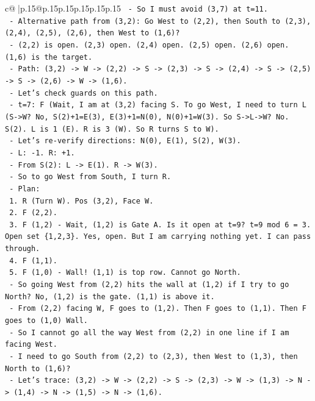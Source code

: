 \documentclass{article}
\begin{document}
{\begin{supertabular}{c@{$\;$}|p{.15\linewidth}@{}p{.15\linewidth}p{.15\linewidth}p{.15\linewidth}p{.15\linewidth}p{.15\linewidth}}
{{{\texttt{  {-} So I must avoid (3,7) at t=11.} \\
\texttt{  {-} Alternative path from (3,2): Go West to (2,2), then South to (2,3), (2,4), (2,5), (2,6), then West to (1,6)?} \\
\texttt{    {-} (2,2) is open. (2,3) open. (2,4) open. (2,5) open. (2,6) open. (1,6) is the target.} \\
\texttt{    {-} Path: (3,2) {-}> W {-}> (2,2) {-}> S {-}> (2,3) {-}> S {-}> (2,4) {-}> S {-}> (2,5) {-}> S {-}> (2,6) {-}> W {-}> (1,6).} \\
\texttt{    {-} Let's check guards on this path.} \\
\texttt{    {-} t=7: F (Wait, I am at (3,2) facing S. To go West, I need to turn L (S{-}>W? No, S(2)+1=E(3), E(3)+1=N(0), N(0)+1=W(3). So S{-}>L{-}>W? No. S(2). L is 1 (E). R is 3 (W). So R turns S to W).} \\
\texttt{    {-} Let's re{-}verify directions: N(0), E(1), S(2), W(3).} \\
\texttt{      {-} L: {-}1. R: +1.} \\
\texttt{      {-} From S(2): L {-}> E(1). R {-}> W(3).} \\
\texttt{      {-} So to go West from South, I turn R.} \\
\texttt{    {-} Plan:} \\
\texttt{      1. R (Turn W). Pos (3,2), Face W.} \\
\texttt{      2. F (2,2).} \\
\texttt{      3. F (1,2) {-} Wait, (1,2) is Gate A. Is it open at t=9? t=9 mod 6 = 3. Open set \{1,2,3\}. Yes, open. But I am carrying nothing yet. I can pass through.} \\
\texttt{      4. F (1,1).} \\
\texttt{      5. F (1,0) {-} Wall! (1,1) is top row. Cannot go North.} \\
\texttt{      {-} So going West from (2,2) hits the wall at (1,2) if I try to go North? No, (1,2) is the gate. (1,1) is above it.} \\
\texttt{      {-} From (2,2) facing W, F goes to (1,2). Then F goes to (1,1). Then F goes to (1,0) Wall.} \\
\texttt{      {-} So I cannot go all the way West from (2,2) in one line if I am facing West.} \\
\texttt{      {-} I need to go South from (2,2) to (2,3), then West to (1,3), then North to (1,6)?} \\
\texttt{      {-} Let's trace: (3,2) {-}> W {-}> (2,2) {-}> S {-}> (2,3) {-}> W {-}> (1,3) {-}> N {-}> (1,4) {-}> N {-}> (1,5) {-}> N {-}> (1,6).} \\
}}}
\end{supertabular}}
\end{document}
